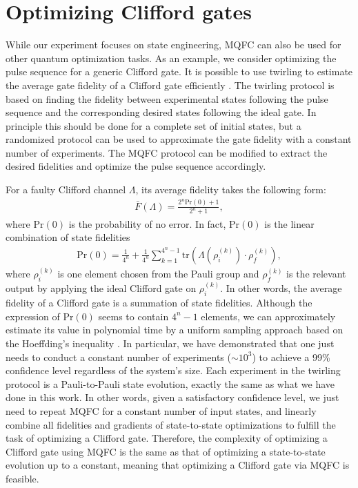 \documentclass[twocolumn,reprint, amsmath,amssymb,showpacs,superscriptaddress]{revtex4-1}
\begin{document}
\section{Optimizing Clifford gates}

While our experiment focuses on state engineering,  MQFC can also be used for other quantum optimization tasks.  As an example, we consider optimizing the pulse sequence for a generic Clifford gate.  It is possible to use twirling to estimate the average gate fidelity of a Clifford gate efficiently  \cite{lu2015experimental}.  The twirling protocol is based on finding the fidelity between  experimental states following the pulse sequence and the corresponding desired states following the ideal gate.  In principle this should be done for a complete set of initial states, but a randomized protocol can be used to approximate the gate fidelity with a constant number of experiments.  The MQFC protocol can be modified to extract the desired fidelities and optimize the pulse sequence accordingly.

For a  faulty Clifford channel $\Lambda$, its average fidelity takes the following form:
\begin{align} \label{fidelity_pr}
\bar{F}(\Lambda) = \frac{2^n \text{Pr}(0) +1}{2^n +1},
\end{align}
where $\text{Pr}(0)$ is the probability of no error. In fact, $\text{Pr}(0)$ is the linear combination of state fidelities
\begin{align} \label{noerror}
\text{Pr}(0) = \frac{1}{4^n} + \frac{1}{4^n}\sum_{k=1}^{4^n-1} \text{tr}\left( \Lambda \left( \rho_{i}^{(k)}\right) \cdot \rho_f^{(k)} \right),
\end{align}
where $\rho_{i}^{(k)} $ is one element chosen from the Pauli group and $\rho_{f}^{(k)} $ is the relevant output by applying the ideal Clifford gate on $\rho_{i}^{(k)} $. In other words, the average fidelity of a Clifford gate is a summation of   state fidelities. Although the expression of $\text{Pr}(0)$ seems to contain $4^n-1$ elements,   we can  approximately estimate its value in polynomial time by a uniform sampling approach based on the Hoeffding's inequality \cite{lu2015experimental}. In particular, we have demonstrated that one just needs to conduct a constant number of experiments ($\sim10^3$) to achieve a 99\% confidence level regardless of the system's size. Each experiment in the twirling protocol is a Pauli-to-Pauli state evolution, exactly the same as what we have done in this work. In other words, given a satisfactory confidence level, we just need to repeat MQFC for a constant number of input states, and linearly combine all fidelities and gradients of state-to-state optimizations to fulfill the task of optimizing a Clifford gate. Therefore, the complexity of optimizing a Clifford gate using MQFC is the same as that of optimizing a state-to-state evolution up to a constant, meaning that optimizing a Clifford gate via MQFC is feasible.
\end{document}

